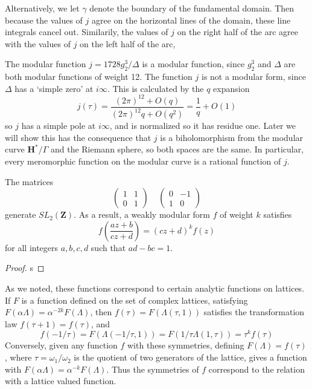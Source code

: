 Alternatively, we let $\gamma$ denote the boundary of the fundamental domain. Then because the values of $j$ agree on the horizontal lines of the domain, these line integrals cancel out. Similarily, the values of $j$ on the right half of the arc agree with the values of $j$ on the left half of the arc,

\begin{example}
    The modular function $j = 1728 g_2^3/\Delta$ is a modular function, since $g_2^3$ and $\Delta$ are both modular functions of weight 12. The function $j$ is not a modular form, since $\Delta$ has a `simple zero' at $i \infty$. This is calculated by the $q$ expansion
    \[ j(\tau) = \frac{(2 \pi)^{12} + O(q)}{(2 \pi)^{12} q + O(q^2)} = \frac{1}{q} + O(1) \]
    so $j$ has a simple pole at $i \infty$, and is normalized so it has residue one. Later we will show this has the consequence that $j$ is a biholomorphism from the modular curve $\mathbf{H}^*/\Gamma$ and the Riemann sphere, so both spaces are the same. In particular, every meromorphic function on the modular curve is a rational function of $j$.
\end{example}

\begin{theorem}
    The matrices
    \[ \begin{pmatrix} 1 & 1 \\ 0 & 1 \end{pmatrix}\ \ \ \ \ \begin{pmatrix} 0 & -1 \\ 1 & 0 \end{pmatrix} \]
    generate $SL_2(\mathbf{Z})$. As a result, a weakly modular form $f$ of weight $k$ satisfies
    \[ f \left( \frac{az + b}{cz + d} \right) = (cz + d)^k f(z) \]
    for all integers $a,b,c,d$ such that $ad - bc = 1$.
\end{theorem}
\begin{proof}
    s
\end{proof}

As we noted, these functions correspond to certain analytic functions on lattices. If $F$ is a function defined on the set of complex lattices, satisfying $F(\alpha \Lambda) = \alpha^{-2k} F(\Lambda)$, then $f(\tau) = F(\Lambda(\tau,1))$ satisfies the transformation law $f(\tau + 1) = f(\tau)$, and
%
\[ f(-1/\tau) = F(\Lambda(-1/\tau,1)) = F(1/\tau \Lambda(1,\tau)) = \tau^k f(\tau) \]
%
Conversely, given any function $f$ with these symmetries, defining $F(\Lambda) = f(\tau)$, where $\tau = \omega_1/\omega_2$ is the quotient of two generators of the lattice, gives a function with $F(\alpha \Lambda) = \alpha^{-k} F(\Lambda)$. Thus the symmetries of $f$ correspond to the relation with a lattice valued function.

